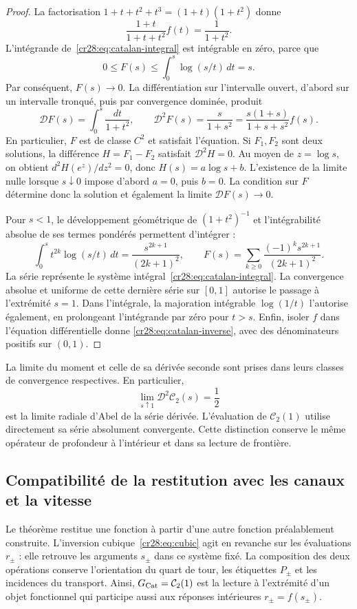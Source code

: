 \begin{proof}
La factorisation $1+t+t^2+t^3=(1+t)(1+t^2)$ donne
\[
 \frac{1+t}{1+t+t^2}f(t)=\frac1{1+t^2}.
\]
L’intégrande de~\eqref{cr28:eq:catalan-integral} est
intégrable en zéro, parce que
\[
 0\leq F(s)\leq\int_0^s\log(s/t)\,dt=s.
\]
Par conséquent, $F(s)\to0$. La différentiation sur l’intervalle ouvert,
d’abord sur un intervalle tronqué, puis par convergence dominée,
produit
\[
 \mathcal DF(s)=\int_0^s\frac{dt}{1+t^2},
 \qquad \mathcal D^2F(s)=\frac{s}{1+s^2}
     =\frac{s(1+s)}{1+s+s^2}f(s).
\]
En particulier, $F$ est de classe $C^2$ et satisfait l’équation.
Si $F_1,F_2$ sont deux solutions, la différence $H=F_1-F_2$
satisfait $\mathcal D^2H=0$. Au moyen de $z=\log s$, on obtient
$d^2H(e^z)/dz^2=0$, donc $H(s)=a\log s+b$.
L’existence de la limite nulle lorsque $s\downarrow0$ impose d’abord
$a=0$, puis $b=0$. La condition sur $F$ détermine donc
la solution et également la limite $\mathcal DF(s)\to0$.

Pour $s<1$, le développement géométrique de $(1+t^2)^{-1}$ et
l’intégrabilité absolue de ses termes pondérés permettent d’intégrer :
\[
 \int_0^s t^{2k}\log(s/t)\,dt
     =\frac{s^{2k+1}}{(2k+1)^2},\qquad
 F(s)=\sum_{k\geq0}\frac{(-1)^ks^{2k+1}}{(2k+1)^2}.
\]
La série représente le système intégral~\eqref{cr28:eq:catalan-integral}. La convergence absolue et uniforme de cette dernière série sur $[0,1]$ autorise le passage à l'extrémité $s=1$. Dans l'intégrale, la majoration intégrable $\log(1/t)$ l'autorise également, en prolongeant l'intégrande par zéro pour $t>s$. Enfin, isoler $f$ dans l'équation différentielle donne \eqref{cr28:eq:catalan-inverse}, avec des dénominateurs positifs sur $(0,1)$.
\end{proof}

La limite du moment et celle de sa dérivée seconde sont prises
dans leurs classes de convergence respectives. En particulier,
\[
 \lim_{s\uparrow1}\mathcal D^2\mathcal C_2(s)=\frac12
\]
est la limite radiale d’Abel de la série dérivée. L’évaluation
de $\mathcal C_2(1)$ utilise directement sa série absolument
convergente. Cette distinction conserve le même opérateur de profondeur
à l’intérieur et dans sa lecture de frontière.

\subsection{Compatibilité de la restitution avec les canaux et la vitesse}
\label{cr28:sec:channels-velocity}

Le théorème restitue une fonction à partir d'une autre fonction préalablement construite. L'inversion cubique~\eqref{cr28:eq:cubic} agit en revanche sur les évaluations $r_\pm$ : elle retrouve les arguments $s_\pm$ dans ce système fixé. La composition des deux opérations conserve l'orientation du quart de tour, les étiquettes $P_\pm$ et les incidences du transport. Ainsi, $G_{\rm Cat}=\mathcal C_2(1)$ est la lecture à l'extrémité d'un objet fonctionnel qui participe aussi aux réponses intérieures $r_\pm=f(s_\pm)$.

